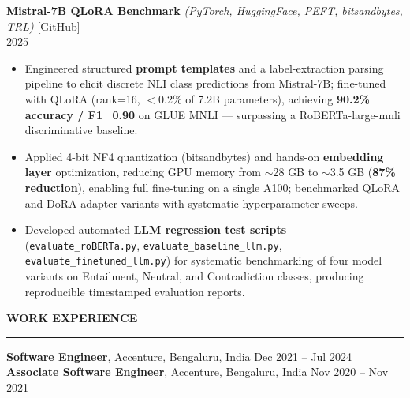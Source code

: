 \documentclass[letterpaper,10.5pt]{extarticle}
\newcommand{\resumesection}[1]{%
    \vspace{6pt}%
    \noindent\textbf{#1}\vspace{-5pt}%
    \\\noindent\rule{\textwidth}{0.5pt}%
    \vspace{1pt}%
}
\begin{document}
\vspace{4pt}

\noindent\textbf{Mistral-7B QLoRA Benchmark} \textit{(PyTorch, HuggingFace, PEFT, bitsandbytes, TRL)} \hfill \href{https://github.com/slowloris-98/NSP_QLoRa}{[GitHub]}\\
2025

\begin{itemize}[leftmargin=12pt, topsep=1pt, itemsep=0pt, parsep=0pt]
    \item Engineered structured \textbf{prompt templates} and a label-extraction parsing pipeline to elicit discrete NLI class predictions from Mistral-7B; fine-tuned with QLoRA (rank=16, $<$0.2\% of 7.2B parameters), achieving \textbf{90.2\% accuracy / F1=0.90} on GLUE MNLI — surpassing a RoBERTa-large-mnli discriminative baseline.
    \item Applied 4-bit NF4 quantization (bitsandbytes) and hands-on \textbf{embedding layer} optimization, reducing GPU memory from $\sim$28 GB to $\sim$3.5 GB (\textbf{87\% reduction}), enabling full fine-tuning on a single A100; benchmarked QLoRA and DoRA adapter variants with systematic hyperparameter sweeps.
    \item Developed automated \textbf{LLM regression test scripts} (\texttt{evaluate\_roBERTa.py}, \texttt{evaluate\_baseline\_llm.py}, \texttt{evaluate\_finetuned\_llm.py}) for systematic benchmarking of four model variants on Entailment, Neutral, and Contradiction classes, producing reproducible timestamped evaluation reports.
\end{itemize}

\resumesection{WORK EXPERIENCE}

\noindent\textbf{Software Engineer}, Accenture, Bengaluru, India \hfill Dec 2021 -- Jul 2024\\
\textbf{Associate Software Engineer}, Accenture, Bengaluru, India \hfill Nov 2020 -- Nov 2021
\end{document}
